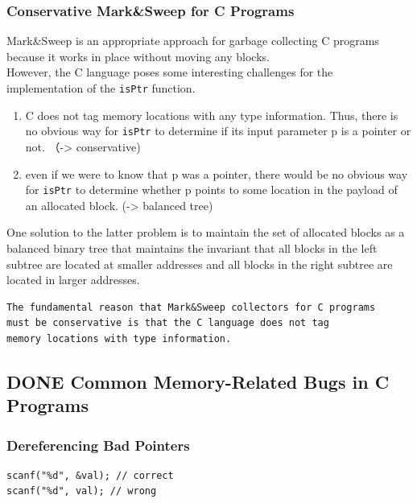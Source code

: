 \documentclass[11pt]{article}
\begin{document}
\subsubsection{Conservative Mark\&Sweep for C Programs}
\label{sec:org79d4c7c}
Mark\&Sweep is an appropriate approach for garbage collecting C programs because it works in place without moving any blocks.\\

However, the C language poses some interesting challenges for the implementation of the \texttt{isPtr} function.\\
\begin{enumerate}
\item C does not tag memory locations with any type information. Thus, there is no obvious way for \texttt{isPtr} to determine if its input parameter p is a pointer or not. （-> conservative)\\
\item even if we were to know that p was a pointer, there would be no obvious way for \texttt{isPtr} to determine whether p points to some location in the payload of an allocated block. (-> balanced tree)\\
\end{enumerate}

One solution to the latter problem is to maintain the set of allocated blocks as a balanced binary tree that maintains the invariant that all blocks in the left subtree are located at smaller addresses and all blocks in the right subtree are located in larger addresses.\\

\begin{verbatim}
The fundamental reason that Mark&Sweep collectors for C programs 
must be conservative is that the C language does not tag 
memory locations with type information. 
\end{verbatim}


\subsection{{\bfseries\sffamily DONE} Common Memory-Related Bugs in C Programs}
\label{sec:org8e08b18}

\subsubsection{Dereferencing Bad Pointers}
\label{sec:org48c7066}
\begin{verbatim}
scanf("%d", &val); // correct
scanf("%d", val); // wrong
\end{verbatim}
\end{document}
